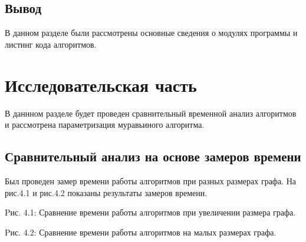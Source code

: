 \documentclass[12pt]{report}
\begin{document}
\section*{Вывод}
В данном разделе были рассмотрены основные сведения о модулях программы и листинг кода алгоритмов.




\chapter{Исследовательская часть}
В даннном разделе будет проведен сравнительный временной анализ алгоритмов и рассмотрена параметризация муравьиного алгоритма.

\section{Сравнительный анализ на основе замеров времени}
Был проведен замер времени работы алгоритмов при разных размерах графа. На рис.4.1 и рис.4.2 показаны результаты замеров времени.


\begin{center}
Pис. 4.1: Сравнение времени работы алгоритмов при увеличении размера графа.
\end{center}

\begin{center}
Pис. 4.2: Сравнение времени работы алгоритмов на малых размерах графа.
\end{center}
\end{document}
